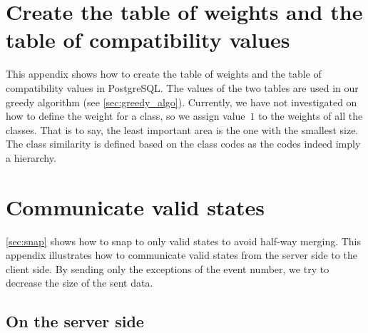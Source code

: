 \documentclass[]{interact}
\begin{document}






\appendix

\section{Create the table of weights and the table of compatibility values}
\label{appx:create_tables}
This appendix shows how to create the table of weights and 
the table of compatibility values in PostgreSQL.
The values of the two tables are used in our greedy algorithm
(see \sect\ref{sec:greedy_algo}).
Currently, we have not investigated on 
how to define the weight for a class,
so we assign value~$1$ to the weights of all the classes.
That is to say, the least important area is the one with the smallest size.
The class similarity is defined based on the class codes 
as the codes indeed imply a hierarchy.

\bigskip



\bigskip

\section{Communicate valid states}
\label{appx:communicate_valid_states}

\sect\ref{sec:snap} shows how to snap to only valid states 
to avoid half-way merging.
This appendix illustrates how to communicate valid states 
from the server side to the client side.
By sending only the exceptions of the event number, 
we try to decrease the size of the sent data.



\subsection{On the server side}
\label{sec:communicate_server}
\end{document}
